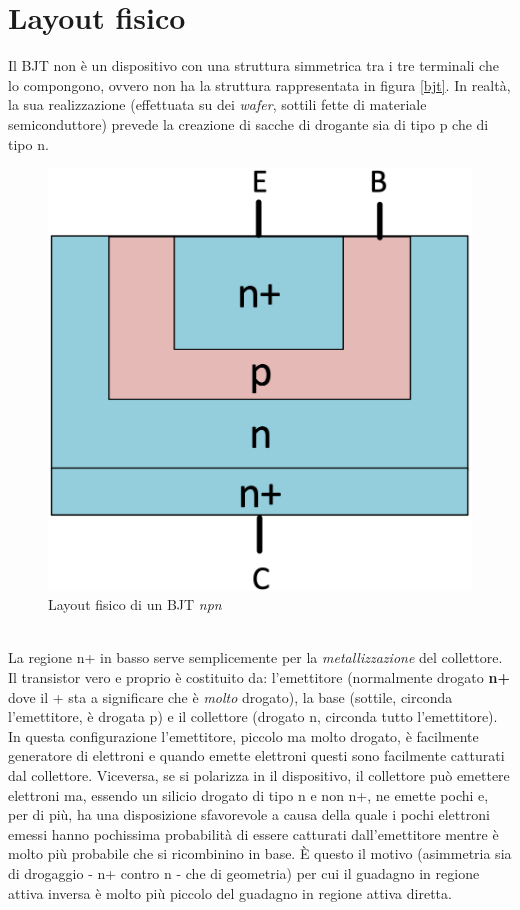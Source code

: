 \documentclass[12pt, a4paper]{report}
\begin{document}
\section{Layout fisico}
Il BJT non è un dispositivo con una struttura simmetrica tra i tre terminali che lo compongono, ovvero non ha la struttura rappresentata in figura \ref{bjt}. In realtà, la sua realizzazione (effettuata su dei \textit{wafer}, sottili fette di materiale semiconduttore) prevede la creazione di sacche di drogante sia di tipo p che di tipo n.
\begin{figure}[h]
    \centering
    \includegraphics[scale=0.3,angle=0]{bjt_layout.png}
    \caption{Layout fisico di un BJT \textit{npn}}
\end{figure}
\\La regione n+ in basso serve semplicemente per la \textit{metallizzazione} del collettore. Il transistor vero e proprio è costituito da: l'emettitore (normalmente drogato \textbf{n+} dove il + sta a significare che è \textit{molto} drogato), la base (sottile, circonda l'emettitore, è drogata p) e il collettore (drogato n, circonda tutto l'emettitore). In questa configurazione l'emettitore, piccolo ma molto drogato, è facilmente generatore di elettroni e quando emette elettroni questi sono facilmente catturati dal collettore. Viceversa, se si polarizza in  il dispositivo, il collettore può emettere elettroni ma, essendo un silicio drogato di tipo n e non n+, ne emette pochi e, per di più, ha una disposizione sfavorevole a causa della quale i pochi elettroni emessi hanno pochissima probabilità di essere catturati dall'emettitore mentre è molto più probabile che si ricombinino in base. È questo il motivo (asimmetria sia di drogaggio - n+ contro n - che di geometria) per cui il guadagno in regione attiva inversa è molto più piccolo del guadagno in regione attiva diretta.
\end{document}
